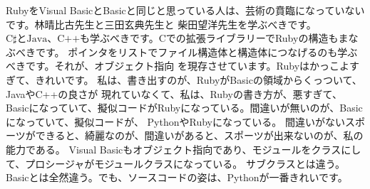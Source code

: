 \documentclass{jsarticle}
\begin{document}
   RubyをVisual BasicとBasicと同じと思っている人は、芸術の賁臨になっていないです。林晴比古先生と三田玄典先生と
   柴田望洋先生を学ぶべきです。$\text{C$\sharp$とJava、C++}$も学ぶべきです。Cでの拡張ライブラリーでRubyの構造もまなぶべきです。
   ポインタをリストでファイル構造体と構造体につなげるのも学ぶべきです。それが、オブジェクト指向
   を現存させています。Rubyはかっこよすぎて、きれいです。
   私は、書き出すのが、RubyがBasicの領域からくっついて、JavaやC++の良さが
   現れていなくて、私は、Rubyの書き方が、悪すぎて、
   Basicになっていて、擬似コードがRubyになっている。間違いが無いのが、Basicになっていて、擬似コードが、
   PythonやRubyになっている。
   間違いがないスポーツができると、綺麗なのが、間違いがあると、スポーツが出来ないのが、私の能力である。
   Visual Basicもオブジェクト指向であり、モジュールをクラスにして、プロシージャがモジュールクラスになっている。
   サブクラスとは違う。Basicとは全然違う。でも、ソースコードの姿は、Pythonが一番きれいです。
\end{document}
